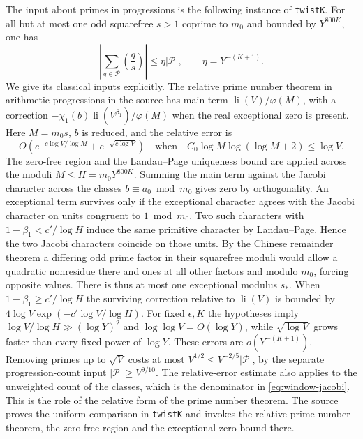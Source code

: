 The input about primes in progressions is the following instance
of \texttt{twistK}. For all but at most one odd squarefree
\(s>1\) coprime to \(m_0\) and bounded by \(Y^{800K}\), one has
\begin{equation}
 \left|\sum_{q\in\mathcal P}\left(\frac{q}{s}\right)\right|
       \le\eta|\mathcal P|,\qquad \eta=Y^{-(K+1)} .
 \label{eq:window-jacobi}
\end{equation}
We give its classical inputs explicitly. The relative
prime number theorem in arithmetic progressions in the source
has main term \(\operatorname{li}(V)/\varphi(M)\), with a correction
\(-\chi_1(b)\operatorname{li}(V^{\beta_1})/\varphi(M)\)
when the real exceptional zero is present. Here
\(M=m_0s\), \(b\) is reduced, and the relative error is
\[
 O\!\left(e^{-c\log V/\log M}+e^{-\sqrt{c\log V}}\right)
 \quad\text{when}\quad C_0\log M\log(\log M+2)\le\log V .
\]
The zero-free region and the Landau--Page uniqueness bound are
applied across the moduli \(M\le H=m_0Y^{800K}\).
Summing the main term against the Jacobi character across the
classes \(b\equiv a_0\bmod m_0\) gives zero by orthogonality.
An exceptional term survives only if the exceptional character
agrees with the Jacobi character on units congruent to \(1\bmod m_0\).
Two such characters with \(1-\beta_1<c'/\log H\) induce the
same primitive character by Landau--Page. Hence the two Jacobi
characters coincide on those units. By the Chinese remainder
theorem a differing odd prime factor in their squarefree moduli
would allow a quadratic nonresidue there and ones at all other
factors and modulo \(m_0\), forcing opposite values.
There is thus at most one exceptional modulus \(s_*\).
When \(1-\beta_1\ge c'/\log H\) the surviving correction
relative to \(\operatorname{li}(V)\) is bounded by
\(4\log V\exp(-c'\log V/\log H)\). For fixed \(\epsilon,K\)
the hypotheses imply \(\log V/\log H\gg(\log Y)^2\) and
\(\log\log V=O(\log Y)\), while \(\sqrt{\log V}\) grows faster
than every fixed power of \(\log Y\). These errors are
\(o(Y^{-(K+1)})\). Removing primes up to \(\sqrt V\)
costs at most \(V^{1/2}\le V^{-2/5}|\mathcal P|\), by the
separate progression-count input \(|\mathcal P|\ge V^{9/10}\).
The relative-error estimate also applies to the unweighted count
of the classes, which is the denominator in \eqref{eq:window-jacobi}.
This is the role of the relative form of the prime number theorem.
The source proves the uniform comparison in \texttt{twistK}
and invokes the relative prime number theorem, the zero-free region
and the exceptional-zero bound there.

